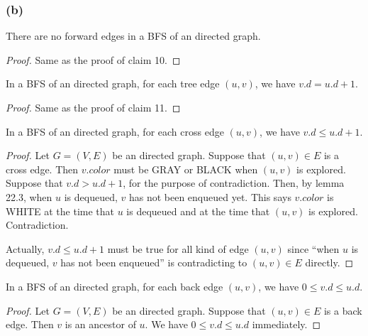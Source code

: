 \subsubsection*{(b)}

\begin{claim}
    There are no forward edges in a BFS of an directed graph.
\end{claim}

\begin{proof}
    Same as the proof of claim 10.
\end{proof}

\begin{claim}
    In a BFS of an directed graph,
    for each tree edge $(u,v)$, we have $v.d=u.d+1$.
\end{claim}

\begin{proof}
    Same as the proof of claim 11.
\end{proof}

\begin{claim}
    In a BFS of an directed graph,
    for each cross edge $(u,v)$, we have $v.d \leq u.d+1$.
\end{claim}

\begin{proof}
    Let $G = (V,E)$ be an directed graph.
    Suppose that $(u,v) \in E$ is a cross edge.
    Then $v.color$ must be GRAY or BLACK when $(u,v)$ is explored.
    Suppose that $v.d > u.d+1$,
    for the purpose of contradiction.
    Then, by lemma 22.3, 
    when $u$ is dequeued, $v$ has not been enqueued yet.
    This says $v.color$ is WHITE at the time that $u$ is dequeued
    and at the time that $(u,v)$ is explored.
    Contradiction.

    Actually, $v.d \leq u.d+1$ must be true for all kind of edge $(u,v)$
    since ``when $u$ is dequeued, $v$ has not been enqueued''
    is contradicting to $(u,v) \in E$ directly.
\end{proof}

\begin{claim}
    In a BFS of an directed graph,
    for each back edge $(u,v)$, we have $0 \leq v.d \leq u.d$.
\end{claim}

\begin{proof}
    Let $G = (V,E)$ be an directed graph.
    Suppose that $(u,v) \in E$ is a back edge.
    Then $v$ is an ancestor of $u$.
    We have $0 \leq v.d \leq u.d$ immediately.
\end{proof}

